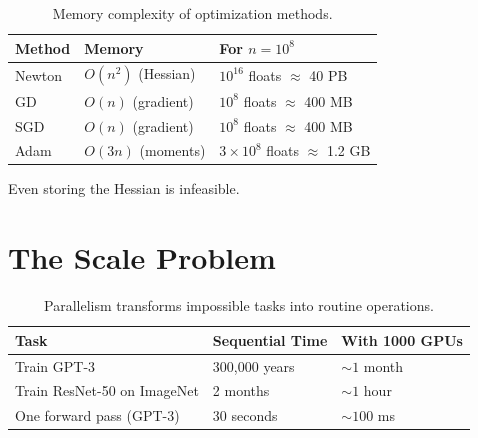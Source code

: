 \begin{table}[ht]
\centering
\begin{tabular}{p{}p{}p{}}
\toprule
\textbf{Method} & \textbf{Memory} & \textbf{For $n = 10^8$} \\
\midrule
Newton & $O(n^2)$ (Hessian) & $10^{16}$ floats $\approx$ 40 PB \\
GD & $O(n)$ (gradient) & $10^8$ floats $\approx$ 400 MB \\
SGD & $O(n)$ (gradient) & $10^8$ floats $\approx$ 400 MB \\
Adam & $O(3n)$ (moments) & $3 \times 10^8$ floats $\approx$ 1.2 GB \\
\bottomrule
\end{tabular}
\vspace{2em}
\caption{Memory complexity of optimization methods.}
\label{tab:memory_complexity}
\end{table}


 Even storing the Hessian is infeasible.




\newpage
\section{The Scale Problem}


\begin{table}[ht]
\centering
\begin{tabular}{p{}p{}p{}}
\toprule
\textbf{Task} & \textbf{Sequential Time} & \textbf{With 1000 GPUs} \\
\midrule
Train GPT-3 & 300,000 years & $\sim 1$ month \\
Train ResNet-50 on ImageNet & 2 months & $\sim 1$ hour \\
One forward pass (GPT-3) & 30 seconds & $\sim 100$ ms \\
\bottomrule
\end{tabular}
\vspace{2em}
\caption{Parallelism transforms impossible tasks into routine operations.}
\label{tab:parallelism_speedup}
\end{table}


